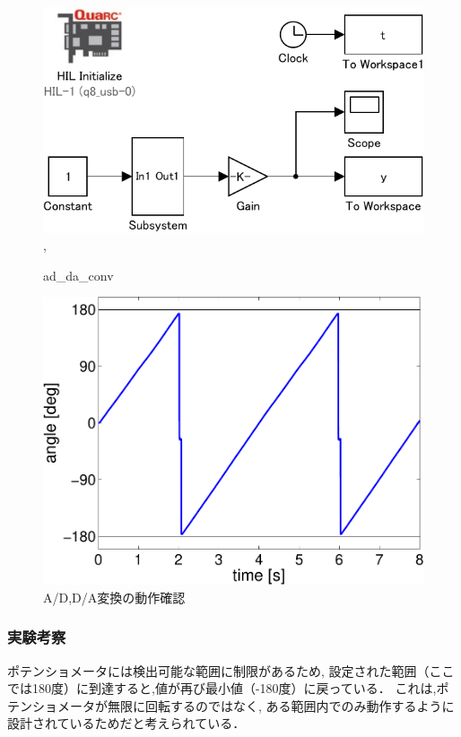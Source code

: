 \begin{figure}[h]
  \centering
  \includegraphics[scale=1]{sozai/ad_da_conv-crop.pdf},
  \caption{ad\_da\_conv}
\end{figure}

\begin{figure}[h]
  \centering
  \includegraphics[scale=0.5]{sozai/figure_ad_da-crop.pdf}
  \caption{A/D,D/A変換の動作確認}
\end{figure}

\subsubsection{実験考察}
ポテンショメータには検出可能な範囲に制限があるため,
設定された範囲（ここでは180度）に到達すると,値が再び最小値（-180度）に戻っている．
これは,ポテンショメータが無限に回転するのではなく,
ある範囲内でのみ動作するように設計されているためだと考えられている．

